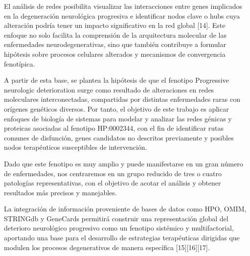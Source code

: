 El análisis de redes posibilita visualizar las interacciones entre genes implicados en la degeneración neurológica progresiva e identificar nodos clave o hubs cuya alteración podría tener un impacto significativo en la red global [14]. Este enfoque no solo facilita la comprensión de la arquitectura molecular de las enfermedades neurodegenerativas, sino que también contribuye a formular hipótesis sobre procesos celulares alterados y mecanismos de convergencia fenotípica.

A partir de esta base, se plantea la hipótesis de que el fenotipo Progressive neurologic deterioration surge como resultado de alteraciones en redes moleculares interconectadas, compartidas por distintas enfermedades raras con orígenes genéticos diversos. Por tanto, el objetivo de este trabajo es aplicar enfoques de biología de sistemas para modelar y analizar las redes génicas y proteicas asociadas al fenotipo HP:0002344, con el fin de identificar rutas comunes de disfunción, genes candidatos no descritos previamente y posibles nodos terapéuticos susceptibles de intervención.

Dado que este fenotipo es muy amplio y puede manifestarse en un gran número de enfermedades, nos centraremos en un grupo reducido de tres o cuatro patologías representativas, con el objetivo de acotar el análisis y obtener resultados más precisos y manejables.

La integración de información proveniente de bases de datos como HPO, OMIM, STRINGdb y GeneCards permitirá construir una representación global del deterioro neurológico progresivo como un fenotipo sistémico y multifactorial, aportando una base para el desarrollo de estrategias terapéuticas dirigidas que modulen los procesos degenerativos de manera específica [15][16][17].

